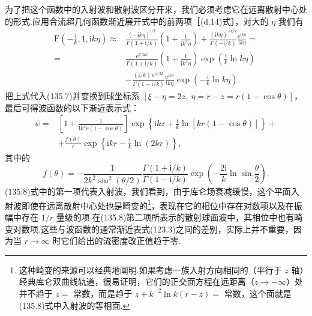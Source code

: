 为了把这个函数中的入射波和散射波区分开来，我们必须考虑它在远离散射中心处的形式.应用合流超几何函数渐近展开式中的前两项［(d.14)式］，对大的 $\eta$ 我们有
\begin{equation*}
\begin{aligned}
  \mathrm{F}\left(-\frac{\mathrm{i}}{k},1,\mathrm{i}k\eta\right)
  \approx{}&\frac{(-\mathrm{i}k\eta)^{\mathrm{i}/k}}
  {\Gamma(1+\mathrm{i}/k)}
  \left(1+\frac{1}{\mathrm{i}k^3\eta}\right)
  +\frac{(\mathrm{i}k\eta)^{-\mathrm{i}/k}}{\Gamma(-\mathrm{i}/k)}
  \frac{\mathrm{e}^{\mathrm{i}k\eta}}{\mathrm{i}k\eta}=\\
  ={}&\frac{\mathrm{e}^{\pi/2k}}{\Gamma(1+\mathrm{i}/k)}
  \left(1+\frac{1}{\mathrm{i}k^3\eta}\right)
  \exp\left(\frac{\mathrm{i}}{k}\ln k\eta\right)\\
  &-\frac{(\mathrm{i}/k)\,\mathrm{e}^{\pi/2k}}{\Gamma(1-\mathrm{i}/k)}
  \frac{\mathrm{e}^{\mathrm{i}k\eta}}{\mathrm{i}k\eta}
  \exp\left(-\frac{\mathrm{i}}{k}\ln k\eta\right).
\end{aligned}
\end{equation*}
把上式代入(135.7)并变换到球坐标系
$\left[\xi-\eta=2z,\ \eta=r-z=r(1-\cos\theta)\right]$，最后可得波函数的以下渐近表示式：
\begin{equation}
\begin{aligned}
  \psi={}&\left[1+\frac{1}{\mathrm{i}k^3r(1-\cos\theta)}\right]
  \exp\left\{\mathrm{i}kz
  +\frac{\mathrm{i}}{k}\ln\left[kr(1-\cos\theta)\right]\right\}+\\
  &+\frac{f(\theta)}{r}
  \exp\left\{\mathrm{i}kr-\frac{\mathrm{i}}{k}\ln(2kr)\right\},
\end{aligned}
\end{equation}
其中的
\begin{equation}
  f(\theta)=-\frac{1}{2k^2\sin^2(\theta/2)}
  \frac{\Gamma(1+\mathrm{i}/k)}{\Gamma(1-\mathrm{i}/k)}
  \exp\left(-\frac{2\mathrm{i}}{k}\ln\sin\frac{\theta}{2}\right).
\end{equation}
(135.8)式中的第一项代表入射波，我们看到，由于库仑场衰减缓慢，这个平面入射波即使在远离散射中心处也是畸变的\footnote{这种畸变的来源可以经典地阐明.如果考虑一族入射方向相同的（平行于 $z$ 轴）经典库仑双曲线轨道，很易证明，它们的正交面方程在远距离（$z\to-\infty$）处并不趋于 $z=$ 常数，而是趋于 $z+k^{-2}\ln k(r-z)=$ 常数，这个面就是(135.8)式中入射波的等相面.}，表现在它的相位中存在对数项以及在振幅中存在 $1/r$ 量级的项.在(135.8)第二项所表示的散射球面波中，其相位中也有畸变对数项.这些与波函数的通常渐近表式(123.3)之间的差别，实际上并不重要，因为当 $r\to\infty$ 时它们给出的流密度改正值趋于零.

